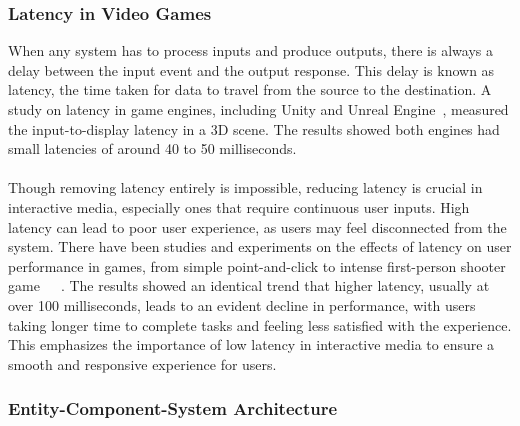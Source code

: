 \subsubsection*{Latency in Video Games}

When any system has to process inputs and produce outputs, there is always a delay between the input event and the output response.
This delay is known as latency, the time taken for data to travel from the source to the destination.
A study on latency in game engines, including Unity and Unreal Engine~\cite{Gotta_Go_Fast}, measured the input-to-display latency in a 3D scene.
The results showed both engines had small latencies of around 40 to 50 milliseconds.
\\\\
Though removing latency entirely is impossible, reducing latency is crucial in interactive media, especially ones that require continuous user inputs.
High latency can lead to poor user experience, as users may feel disconnected from the system.
There have been studies and experiments on the effects of latency on user performance in games, from simple point-and-click to intense
first-person shooter game~\cite{Playing_With_Delay}~\cite{Latency_And_Perspective}~\cite{Lower_Better}.
The results showed an identical trend that higher latency, usually at over 100 milliseconds, leads to an evident decline in performance,
with users taking longer time to complete tasks and feeling less satisfied with the experience.
This emphasizes the importance of low latency in interactive media to ensure a smooth and responsive experience for users.

\subsubsection*{Entity-Component-System Architecture}

